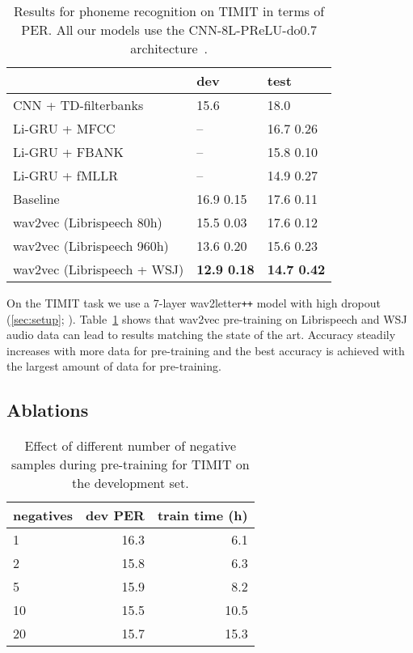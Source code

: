\documentclass{article} \pdfoutput=1
\newcommand{\wav}{wav2vec}
\newcommand{\libri}{Librispeech}
\newcommand{\wavtoletter}{wav2letter\texttt{+\!+}}
\begin{document}
\begin{table}[t]
\centering
\begin{tabular}{lll}
\toprule
{} &   dev &  test \\
\midrule
CNN + TD-filterbanks~\citep{zeghidour2018filters} & 15.6 & 18.0 \\
Li-GRU + MFCC~\citep{ravanelli2018light} & -- & 16.7  0.26 \\
Li-GRU + FBANK~\citep{ravanelli2018light} & -- & 15.8  0.10 \\
Li-GRU + fMLLR~\citep{ravanelli2018light} & -- & 14.9  0.27 \\
\midrule
Baseline & 16.9  0.15 & 17.6  0.11  \\
\wav{} (\libri{} 80h) & 15.5  0.03 & 17.6  0.12 \\
\wav{} (\libri{} 960h) & 13.6  0.20 & 15.6  0.23 \\
\wav{} (\libri{} + WSJ) & \textbf{12.9  0.18} & \textbf{14.7  0.42} \\
\bottomrule
\end{tabular}
\caption{Results for phoneme recognition on TIMIT in terms of PER.
All our models use the CNN-8L-PReLU-do0.7 architecture~\citep{zeghidour2018filters}.
}
\label{tbl:timit-results}
\end{table}
 
On the TIMIT task we use a 7-layer \wavtoletter{} model with high dropout (\textsection\ref{sec:setup}; \citet{synnaeve2016temporal}).
Table~\ref{tbl:timit-results} shows that wav2vec pre-training on Librispeech and WSJ audio data can lead to results matching the state of the art. 
Accuracy steadily increases with more data for pre-training and the best accuracy is achieved with the largest amount of data for pre-training.

\subsection{Ablations}
\label{sec:ablations}



\begin{table}[t]
\centering

\begin{tabular}{lrr}
\toprule
negatives &  dev PER & train time (h)\\
\midrule
1 & 16.3 & 6.1 \\
2 & 15.8 & 6.3 \\
5 &	15.9 & 8.2 \\
10 & 15.5 & 10.5 \\
20 & 15.7 & 15.3 \\
\bottomrule
\end{tabular}
\caption{Effect of different number of negative samples during pre-training for TIMIT on the development set.
}
\label{tbl:negatives}
\end{table} 
\end{document}
